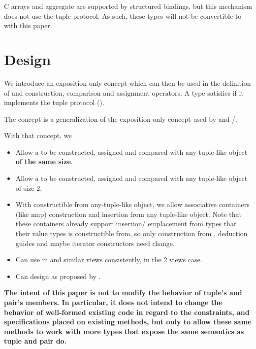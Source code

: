 \documentclass{wg21}
\begin{document}
C arrays and aggregate are supported by structured bindings, but this mechanism does not use the tuple protocol.
As such, these types will not be convertible to  with this paper.


\section{Design}

We introduce an exposition only concept  which can then be used in the definition of  and  construction,
comparison and assignment operators.
A type satisfies  if it implements the tuple protocol ().

The concept is a generalization of the  exposition-only concept used by  and /.

With that concept, we

\begin{itemize}
    \item Allow a  to be constructed, assigned and compared with any tuple-like object \textbf{of the same size}.
    \item Allow a  to be constructed, assigned and compared with any tuple-like object of size 2.
    \item With  constructible from any-tuple-like object, we allow associative containers (like map) construction and insertion from any tuple-like object.
    Note that these containers already support insertion/ emplacement from types that their value types is constructible from, so only construction from ,
    deduction guides and maybe iterator constructors need change.
    \item Can use  in  and similar views consistently, in the 2 views case.
    \item Can design  as proposed by .
\end{itemize}

\textbf{The intent of this paper is not to modify the behavior of tuple's and pair's members. In particular, it does not intend to change the behavior of well-formed existing code in regard
to the constraints,  and  specifications placed on existing methods, but only to allow these same methods to work with more types that expose the same semantics as tuple and pair do.}
\end{document}
